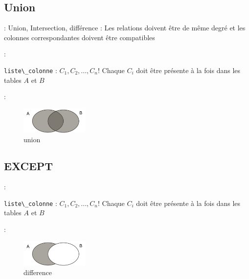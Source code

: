 \documentclass[10pt]{beamer}
\begin{document}
\subsection{Union}
\begin{frame}{\secname : \subsecname}
    Union, Intersection, différence :
    Les relations doivent être de même degré et les colonnes correspondantes doivent être compatibles
\end{frame}

\begin{frame}{\secname : \subsecname}
    
    \lstinline[language=bnf]!liste\_colonne! : $C_1, C_2, ... , C_n$!
    Chaque $C_i$ doit être présente à la fois dans les tables $A$ et $B$
\end{frame}

\begin{frame}{\secname : \subsecname}
    
    \begin{figure}
        \begin{center}
            \includegraphics[width=0.3\textwidth]{../assets/img/union.pdf}
            \caption{union}
        \end{center}
    \end{figure}
\end{frame}
\subsection{EXCEPT}
\begin{frame}{\secname : \subsecname}
    
    \lstinline[language=bnf]!liste\_colonne! : $C_1, C_2, ... , C_n$!
    Chaque $C_i$ doit être présente à la fois dans les tables $A$ et $B$
\end{frame}

\begin{frame}{\secname : \subsecname}
    
    \begin{figure}
        \begin{center}
            \includegraphics[width=0.3\textwidth]{../assets/img/difference.pdf}
            \caption{difference}
        \end{center}
    \end{figure}
\end{frame}
\end{document}
